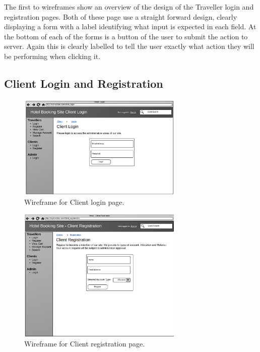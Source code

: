 \documentclass{article}
\begin{document}
The first to wireframes show an overview of the design of the Traveller login and registration pages. Both of these page use a straight forward design, clearly displaying a form with a label identifying what input is expected in each field. At the bottom of each of the forms is a button of the user to submit the action to server. Again this is clearly labelled to tell the user exactly what action they will be performing when clicking it.

\subsection{Client Login and Registration}

\begin{figure}[H]
\centering
\includegraphics[width=0.7\textwidth]{img/wireframes/ClientLogin.png}
\caption{Wireframe for Client login page.}
\label{fig:wireframe-client-login}
\end{figure}

\begin{figure}[H]
\centering
\includegraphics[width=0.7\textwidth]{img/wireframes/ClientRegister.png}
\caption{Wireframe for Client registration page.}
\label{fig:wireframe-client-register}
\end{figure}
\end{document}

